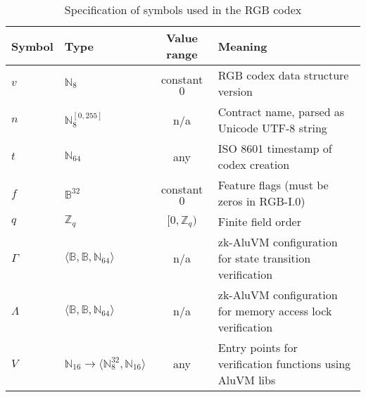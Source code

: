 \documentclass[9pt,oneside]{amsart}
\begin{document}
\begin{table}[h]
\centering
\caption{Specification of symbols used in the RGB codex}\label{tab:codex}
\begin{tabular}{ l l c p{8cm} }
\toprule
Symbol & Type & Value range & Meaning \\
\midrule
$v$ & $\mathbb{N}_8$ & constant $0$ & RGB codex data structure version \\
$n$ & $\mathbb{N}_8^{[0, 255]}$ & n/a & Contract name, parsed as Unicode UTF-8 string \\
$t$ & $\mathbb{N}_{64}$ & any & ISO 8601 timestamp of codex creation \\
$f$ & $\mathbb{B}^{32}$ & constant $0$ & Feature flags (must be zeros in RGB-I.0) \\
$q$ & $\mathbb{Z}_q$ & $[0, \mathbb{Z}_q)$ & Finite field order \\
$\mathsf{\Gamma}$ & $\langle \mathbb{B}, \mathbb{B}, \mathbb{N}_{64} \rangle$ & n/a &  zk-AluVM configuration for state transition verification \\
$\mathsf{\Lambda}$ & $\langle \mathbb{B}, \mathbb{B}, \mathbb{N}_{64} \rangle$ & n/a & zk-AluVM configuration for memory access lock verification \\
$V$ & $\mathbb{N}_{16} \rightarrow \langle \mathbb{N}_8^{32}, \mathbb{N}_{16} \rangle$ & any & Entry points for verification functions using AluVM libs \\
\bottomrule
\end{tabular}
\end{table}
\end{document}
